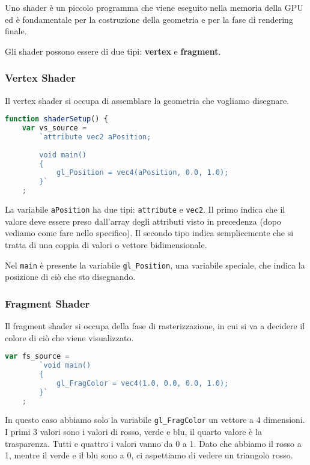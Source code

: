 Uno shader \`e un piccolo programma che viene eseguito nella memoria della GPU ed \`e
fondamentale per la costruzione della geometria e per la fase di rendering finale.

Gli shader possono essere di due tipi: \textbf{vertex} e \textbf{fragment}.

\subsubsection{Vertex Shader}
Il vertex shader si occupa di assemblare la geometria che vogliamo disegnare.
\begin{lstlisting}[language=javascript]
function shaderSetup() {
	var vs_source =
		`attribute vec2 aPosition;
		
		void main()
		{
			gl_Position = vec4(aPosition, 0.0, 1.0);
		}`
	;
\end{lstlisting}
La variabile \verb|aPosition| ha due tipi: \verb|attribute| e \verb|vec2|. Il primo
indica che il valore deve essere preso dall'array degli attributi visto in precedenza
(dopo vediamo come fare nello specifico). Il secondo tipo indica semplicemente che
si tratta di una coppia di valori o vettore bidimensionale.

Nel \verb|main| \`e presente la variabile \verb|gl_Position|, una variabile speciale, che
indica la posizione di ci\`o che sto disegnando.

\subsubsection{Fragment Shader}
Il fragment shader si occupa della fase di rasterizzazione, in cui si va a decidere il
colore di ci\`o che viene visualizzato.
\begin{lstlisting}[language=javascript, firstnumber=8]
	var fs_source =
		`void main()
		{
			gl_FragColor = vec4(1.0, 0.0, 0.0, 1.0);
		}`
	;
\end{lstlisting}
In questo caso abbiamo solo la variabile \verb|gl_FragColor| un vettore a 4 dimensioni.
I primi 3 valori sono i valori di rosso, verde e blu, il quarto valore \`e la trasparenza.
Tutti e quattro i valori vanno da 0 a 1. Dato che abbiamo il rosso a 1, mentre il verde e
il blu sono a 0, ci aspettiamo di vedere un triangolo rosso.

